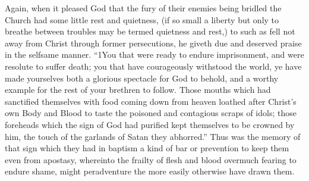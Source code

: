 Again, when it pleased God that the fury of their enemies being bridled the Church had some little rest and quietness, (if so small a liberty but only to breathe between troubles may be termed quietness and rest,) to such as fell not away from Christ through former persecutions, he giveth due and deserved praise in the selfsame manner. “1You that were ready to endure imprisonment, and were resolute to suffer death; you that have courageously withstood the world, ye have made yourselves both a glorious spectacle for God to behold, and a worthy example for the rest of your brethren to follow. Those mouths which had sanctified themselves with food coming down from heaven loathed after Christ’s own Body and Blood to taste the poisoned and contagious scraps of idols; those foreheads which the sign of God had purified kept themselves to be crowned by him, the touch of the garlands of Satan they abhorred.” Thus was the memory of that sign which they had in baptism a kind of bar or prevention to keep them even from apostasy, whereinto the frailty of flesh and blood overmuch fearing to endure shame, might peradventure the more easily otherwise have drawn them.

